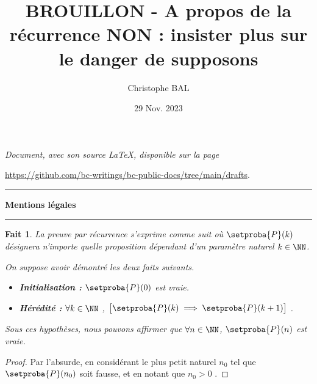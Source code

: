 \documentclass[12pt]{amsart}
\newtheorem{fact}{Fait}[section]
\begin{document}
\title{BROUILLON - A propos de la récurrence  NON : insister plus sur le danger de supposons}
\author{Christophe BAL}
\date{29 Nov. 2023}

\maketitle

\begin{center}
	\itshape
	Document, avec son source \LaTeX, disponible sur la page

	\url{https://github.com/bc-writings/bc-public-docs/tree/main/drafts}.
\end{center}


\bigskip


\begin{center}
	\hrule\vspace{.3em}
	{
		\fontsize{1.35em}{1em}\selectfont
		\textbf{Mentions \og légales \fg}
	}

	\vspace{0.45em}
	\doclicenseThis
	\hrule
\end{center}


\bigskip




\begin{fact} \label{recursivity}
	La preuve par récurrence s'exprime comme suit où $\setproba{P}(k)$ désignera n'importe quelle proposition dépendant d'un paramètre naturel $k \in \NN$.

	\medskip

	On suppose avoir démontré les deux faits suivants.

	\begin{itemize}[label=\small\textbullet]
		\item \textbf{Initialisation :}
		      $\setproba{P}(0)$ est vraie.

		\item \textbf{Hérédité :}
		      $\forall k \in \NN$ , $\big[ \setproba{P}(k) \implies \setproba{P}(k+1) \big]$ .
	\end{itemize}

	Sous ces hypothèses, nous pouvons affirmer que $\forall n \in \NN$, $\setproba{P}(n)$ est vraie.
\end{fact}


\begin{proof}
	Par l'absurde, en considérant le plus petit naturel $n_0$ tel que $\setproba{P}(n_0)$ soit fausse, et en notant que $n_0 > 0$ .
\end{proof}
\end{document}

